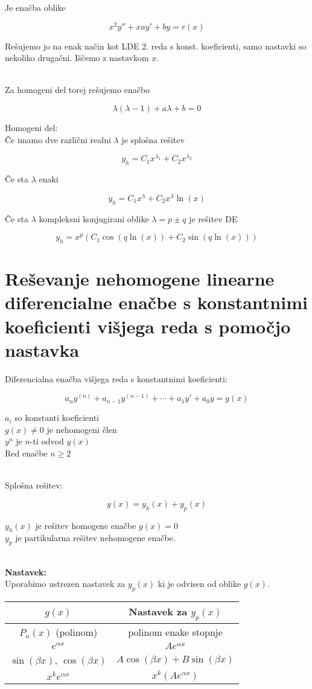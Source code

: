 \documentclass[12pt]{report}
\begin{document}
Je enačba oblike

\[
x^2y'' + xay' + by = r(x)
\]

Rešujemo jo na enak način kot LDE 2. reda s konst. koeficienti, samo nastavki so nekoliko drugačni. Iščemo z nastavkom $x$. \\\

Za homogeni del torej rešujemo enačbo

\[\lambda(\lambda -1) +a\lambda + b = 0 \]

Homogeni del:\\
Če imamo dve različni realni $\lambda$ je splošna rešitev

\[y_h = C_1x^{\lambda_1} + C_2x^{\lambda_2}\]

Če sta $\lambda$ enaki

\[y_h = C_1x^{\lambda} + C_2x^{\lambda}\ln(x)\]

Če sta $\lambda$ kompleksni konjugirani oblike $\lambda = p \pm q$ je rešitev DE


\[y_h=x^p(C_1\cos(q\ln(x))+C_2\sin(q\ln(x)))\]


\section*{Reševanje nehomogene linearne diferencialne enačbe s konstantnimi koeficienti višjega reda s pomočjo nastavka}

Diferencialna enačba višjega reda s konstantnimi koeficienti:

\[a_ny^{(n)} + a_{n-1}y^{(n-1)} + \cdots + a_1y' + a_0y = g(x)\]

$a_i$ so konstanti koeficienti\\
$g(x) \neq 0 $ je nehomogeni člen\\
$y^n$ je $n$-ti odvod $y(x)$\\
Red enačbe $n \geq 2$\\\

Splošna rešitev:

\[y(x) = y_h(x)+y_p(x)\]

$y_h(x)$ je rešitev homogene enačbe $g(x) = 0$\\$y_p$ je partikularna rešitev nehomogene enačbe.\\\

\textbf{Nastavek:}\\
Uporabimo ustrezen nastavek za $y_p(x)$ ki je odvisen od oblike $ g(x)$.

\begin{center}


\begin{tabular}{|c|c|}
\hline
$g(x)$ & Nastavek za $y_p(x)$ \\
\hline
$P_n(x)$ (polinom) & polinom enake stopnje \\
$e^{\alpha x}$ & $Ae^{\alpha x}$ \\
$\sin(\beta x)$, $\cos(\beta x)$ & $A \cos(\beta x) + B \sin(\beta x)$ \\
$x^k e^{\alpha x}$ & $x^k (Ae^{\alpha x})$ \\
\hline
\end{tabular}
\end{center}
\end{document}
